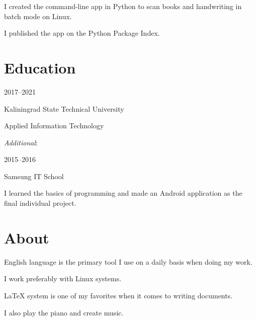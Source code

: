 \documentclass [12pt] {article}
\begin{document}
I created the command-line app in Python to scan books and handwriting in
batch mode on Linux.

I published the app on the Python Package Index.

\section {Education}

2017--2021

Kaliningrad State Technical University

Applied Information Technology

\bigskip

\emph {Additional}:

2015--2016

Samsung IT School

I learned the basics of programming
and made an Android application as the final individual project.

\section {About}

English language is the primary tool
I use on a daily basis when doing my work.

I work preferably with Linux systems.

LaTeX system is one of my favorites
when it comes to writing documents.

I also play the piano and create music.
\end{document}
